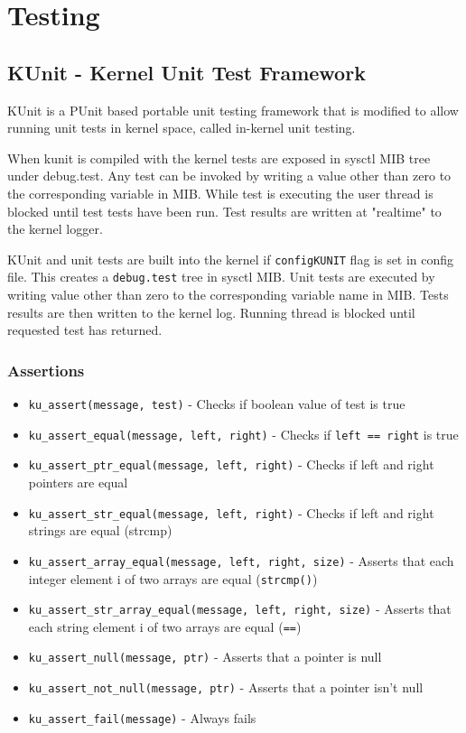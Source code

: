 \part{Testing}

\chapter{KUnit - Kernel Unit Test Framework}

KUnit is a PUnit based portable unit testing framework that is modified to allow
running unit tests in kernel space, called in-kernel unit testing.

When kunit is compiled with the kernel tests are exposed in sysctl MIB tree
under debug.test. Any test can be invoked by writing a value other than zero
to the corresponding variable in MIB. While test is executing the user thread
is blocked until test tests have been run. Test results are written at
"realtime" to the kernel logger.

KUnit and unit tests are built into the kernel if \verb+configKUNIT+ flag is set
in config file. This creates a \verb+debug.test+ tree in sysctl \ac{MIB}. Unit
tests are executed by writing value other than zero to the corresponding
variable name in MIB. Tests results are then written to the kernel log.
Running thread is blocked until requested test has returned.

\section{Assertions}

\begin{itemize}
\item \verb+ku_assert(message, test)+ - Checks if boolean value of test is true
\item \verb+ku_assert_equal(message, left, right)+ - Checks if
      \verb+left == right+ is true
\item \verb+ku_assert_ptr_equal(message, left, right)+ - Checks if left and
      right pointers are equal
\item \verb+ku_assert_str_equal(message, left, right)+ - Checks if left and
      right strings are equal (strcmp)
\item \verb+ku_assert_array_equal(message, left, right, size)+ - Asserts that
      each integer element i of two arrays are equal (\verb+strcmp()+)
\item \verb+ku_assert_str_array_equal(message, left, right, size)+ - Asserts
      that each string element i of two arrays are equal (\verb+==+)
\item \verb+ku_assert_null(message, ptr)+ - Asserts that a pointer is null
\item \verb+ku_assert_not_null(message, ptr)+ - Asserts that a pointer isn't
      null
\item \verb+ku_assert_fail(message)+ - Always fails
\end{itemize}
